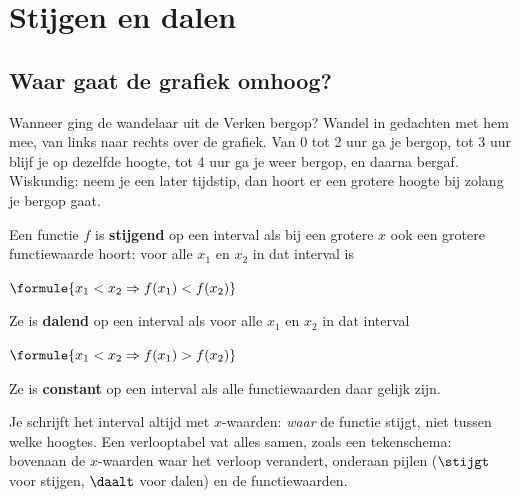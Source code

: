 
\begin{oefeningen}
\end{oefeningen}

\section{Stijgen en dalen}

\subsection{Waar gaat de grafiek omhoog?}

Wanneer ging de wandelaar uit de Verken bergop? Wandel in gedachten met hem mee, van links naar rechts over de grafiek. Van 0 tot 2 uur ga je bergop, tot 3 uur blijf je op dezelfde hoogte, tot 4 uur ga je weer bergop, en daarna bergaf. Wiskundig: neem je een later tijdstip, dan hoort er een grotere hoogte bij zolang je bergop gaat.

\begin{theorie}
Een functie $f$ is \textbf{\textcolor{accent}{stijgend}} op een interval als bij een grotere $x$ ook een grotere functiewaarde hoort: voor alle $x_1$ en $x_2$ in dat interval is

\vspace{1mm}
\qquad $\formule{x_1 < x_2 \Rightarrow f(x_1) < f(x_2)}$

Ze is \textbf{\textcolor{accent}{dalend}} op een interval als voor alle $x_1$ en $x_2$ in dat interval

\vspace{1mm}
\qquad $\formule{x_1 < x_2 \Rightarrow f(x_1) > f(x_2)}$

Ze is \textbf{\textcolor{accent}{constant}} op een interval als alle functiewaarden daar gelijk zijn.
\end{theorie}

Je schrijft het interval altijd met $x$-waarden: \textit{waar} de functie stijgt, niet tussen welke hoogtes. Een verlooptabel vat alles samen, zoals een tekenschema: bovenaan de $x$-waarden waar het verloop verandert, onderaan pijlen ($\stijgt$ voor stijgen, $\daalt$ voor dalen) en de functiewaarden.

